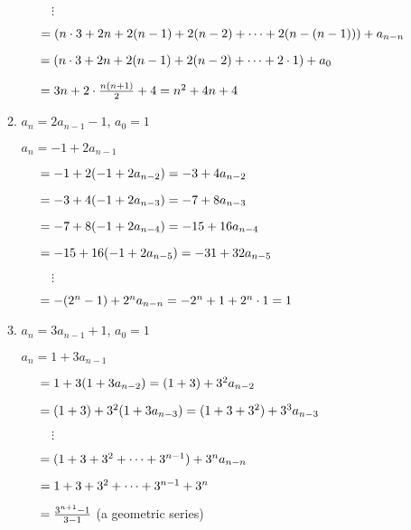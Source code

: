 \documentclass[11pt]{article}
\begin{document}
\begin{enumerate}[label=\textbf{\arabic*.}]
\begin{enumerate}[label=\textbf{\alph*)}]
		$\hspace{1cm} \vdots$
		
		$\hspace{0.5cm} = (n \cdot 3 + 2n + 2(n - 1) + 2(n - 2) + \cdots + 2(n - (n - 1))) + a_{n - n}$
		
		$\hspace{0.5cm} = (n \cdot 3 + 2n + 2(n - 1) + 2(n - 2) + \cdots + 2 \cdot 1) + a_0$
		
		$\hspace{0.5cm} = 3n +2 \cdot \frac{n(n + 1)}{2} + 4 = n^2 + 4n + 4$
		
		\item $a_n = 2a_{n - 1} - 1$, $a_0 = 1$
		
		$a_n = -1 + 2a_{n - 1}$
		
		$\hspace{0.5cm} = -1 + 2(-1 + 2a_{n - 2}) = -3 + 4a_{n - 2}$
		
		$\hspace{0.5cm} = -3 + 4(-1 + 2a_{n - 3}) = -7 + 8a_{n - 3}$
		
		$\hspace{0.5cm} = -7 + 8(-1 + 2a_{n - 4}) = -15 + 16a_{n - 4}$
		
		$\hspace{0.5cm} = -15 + 16(-1 + 2a_{n - 5}) = -31 + 32a_{n - 5}$
		
		$\hspace{1cm} \vdots$
		
		$\hspace{0.5cm} = -(2^n - 1) + 2^na_{n - n} = -2^n + 1 +2^n \cdot 1 = 1$
		
		\item $a_n = 3a_{n - 1} + 1$, $a_0 = 1$
		
		$a_n = 1 + 3a_{n - 1}$
		
		$\hspace{0.5cm} = 1 + 3(1 + 3a_{n - 2}) = (1 + 3) + 3^2a_{n - 2}$
		
		$\hspace{0.5cm} = (1 + 3) + 3^2(1 + 3a_{n - 3}) = (1 + 3 + 3^2) + 3^3a_{n - 3}$
		
		$\hspace{1cm} \vdots$
		
		$\hspace{0.5cm} = (1 + 3 + 3^2 + \cdots + 3^{n - 1}) + 3^na_{n - n}$
		
		$\hspace{0.5cm} = 1 + 3 + 3^2 + \cdots + 3^{n - 1} + 3^n$
		
		$\hspace{0.5cm} = \frac{3^{n + 1} - 1}{3 - 1}$ (a geometric series)
		

\end{enumerate}
\end{enumerate}
\end{document}

